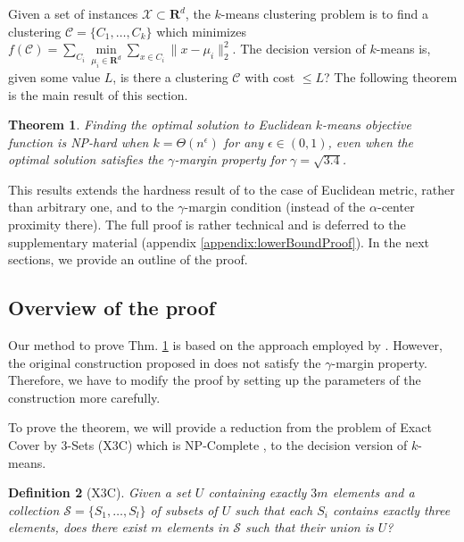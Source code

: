 \documentclass[12pt]{article}
\newcommand{\mc}{\mathcal}
\newcommand{\mb}{\mathbf}
\newtheorem{theorem}{Theorem}
\newtheorem{definition}[theorem]{Definition}
\begin{document}
Given a set of instances $\mc X \subset \mb R ^d$, the $k$-means clustering problem is to find a clustering $\mc C = \{C_1, \ldots, C_k\}$ which minimizes $f(\mc C) = \sum\limits_{C_i} \min\limits_{\mu_i\in {\mb R}^d}\sum\limits_{x\in C_i} \|x - \mu_i \|_2^2$. The decision version of $k$-means is, given some value $L$, is there a clustering $\mc C$ with cost $\le L$? The following theorem is the main result of this section. 

\begin{theorem}
\label{thm:gammaLower}
Finding the optimal solution to Euclidean $k$-means objective function is NP-hard when $k=\Theta(n^\epsilon)$ for any $\epsilon \in (0,1)$, even when the optimal solution satisfies the $\gamma$-margin property for $\gamma = \sqrt{3.4}$.
\end{theorem}

This results extends the hardness result of \cite{ben2014data} to the case of Euclidean 
metric, rather than arbitrary one, and to the $\gamma$-margin condition (instead of the $\alpha$-center proximity there). The full proof is rather technical and is deferred to the supplementary material (appendix \ref{appendix:lowerBoundProof}). In the next sections, we provide an outline of the proof. 

\subsection{Overview of the proof}

Our method to prove Thm. \ref{thm:gammaLower} is based on the approach employed by \cite{vattani2009hardness}. However, the original construction proposed in \cite{vattani2009hardness} does not satisfy the $\gamma$-margin property. Therefore, we have to modify the proof by setting up the parameters of the construction more carefully. 

To prove the theorem, we will provide a reduction from the problem of Exact Cover by 3-Sets (\textsc{X3C}) which is NP-Complete \cite{garey2002computers}, to the decision version of $k$-means.

\begin{definition}[\textsc{X3C}]
Given a set $U$ containing exactly $3m$ elements and a collection $\mc S = \{S_1, \ldots, S_l\}$ of subsets of $U$ such that each $S_i$ contains exactly three elements, does there exist $m$ elements in $\mc S$ such that their union is $U$? 
\end{definition}
\end{document}

